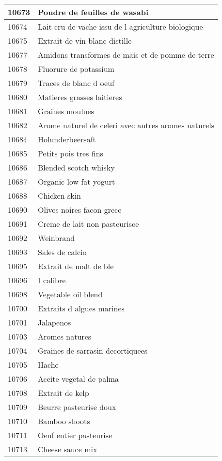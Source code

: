 \begin{longtable}{|l|l|}
10673 & Poudre de feuilles de wasabi \\ \hline 
10674 & Lait cru de vache issu de l agriculture biologique \\ \hline 
10675 & Extrait de vin blanc distille \\ \hline 
10677 & Amidons transformes de mais et de pomme de terre \\ \hline 
10678 & Fluorure de potassium \\ \hline 
10679 & Traces de blanc d oeuf \\ \hline 
10680 & Matieres grasses laitieres \\ \hline 
10681 & Graines moulues \\ \hline 
10682 & Arome naturel de celeri avec autres aromes naturels \\ \hline 
10684 & Holunderbeersaft \\ \hline 
10685 & Petits pois tres fins \\ \hline 
10686 & Blended scotch whisky \\ \hline 
10687 & Organic low fat yogurt \\ \hline 
10688 & Chicken skin \\ \hline 
10690 & Olives noires facon grece \\ \hline 
10691 & Creme de lait non pasteurisee \\ \hline 
10692 & Weinbrand \\ \hline 
10693 & Sales de calcio \\ \hline 
10695 & Extrait de malt de ble \\ \hline 
10696 & I calibre \\ \hline 
10698 & Vegetable oil blend \\ \hline 
10700 & Extraits d algues marines \\ \hline 
10701 & Jalapenos \\ \hline 
10703 & Aromes natures \\ \hline 
10704 & Graines de sarrasin decortiquees \\ \hline 
10705 & Hache \\ \hline 
10706 & Aceite vegetal de palma \\ \hline 
10708 & Extrait de kelp \\ \hline 
10709 & Beurre pasteurise doux \\ \hline 
10710 & Bamboo shoots \\ \hline 
10711 & Oeuf entier pasteurise \\ \hline 
10713 & Cheese sauce mix \\ \hline 

\end{longtable}
